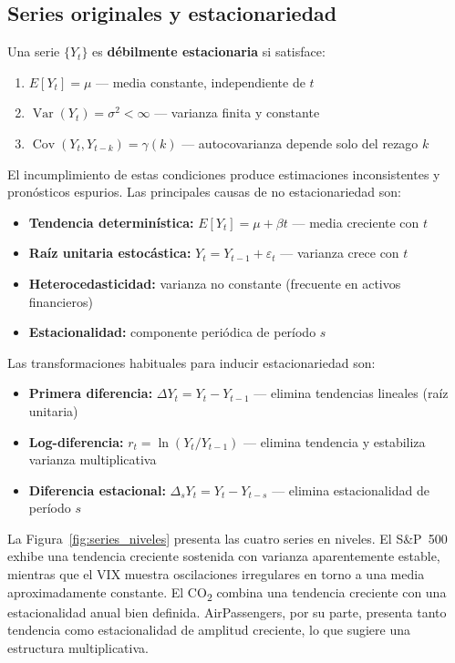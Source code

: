\documentclass[12pt, a4paper]{article}
\begin{document}
\subsection{Series originales y estacionariedad}

Una serie $\{Y_t\}$ es \textbf{débilmente estacionaria} si satisface:

\begin{enumerate}
    \item $E[Y_t] = \mu$ — media constante, independiente de $t$
    \item $\operatorname{Var}(Y_t) = \sigma^2 < \infty$ — varianza finita y constante
    \item $\operatorname{Cov}(Y_t, Y_{t-k}) = \gamma(k)$ — autocovarianza depende solo del rezago $k$
\end{enumerate}

El incumplimiento de estas condiciones produce estimaciones inconsistentes y pronósticos espurios. Las principales causas de no estacionariedad son:

\begin{itemize}
    \item \textbf{Tendencia determinística:} $E[Y_t] = \mu + \beta t$ — media creciente con $t$
    \item \textbf{Raíz unitaria estocástica:} $Y_t = Y_{t-1} + \varepsilon_t$ — varianza crece con $t$
    \item \textbf{Heterocedasticidad:} varianza no constante (frecuente en activos financieros)
    \item \textbf{Estacionalidad:} componente periódica de período $s$
\end{itemize}

Las transformaciones habituales para inducir estacionariedad son:

\begin{itemize}
    \item \textbf{Primera diferencia:} $\Delta Y_t = Y_t - Y_{t-1}$ — elimina tendencias lineales (raíz unitaria)
    \item \textbf{Log-diferencia:} $r_t = \ln(Y_t/Y_{t-1})$ — elimina tendencia y estabiliza varianza multiplicativa
    \item \textbf{Diferencia estacional:} $\Delta_s Y_t = Y_t - Y_{t-s}$ — elimina estacionalidad de período $s$
\end{itemize}

La Figura~\ref{fig:series_niveles} presenta las cuatro series en niveles. El S\&P~500 exhibe una tendencia creciente sostenida con varianza aparentemente estable, mientras que el VIX muestra oscilaciones irregulares en torno a una media aproximadamente constante. El CO\textsubscript{2} combina una tendencia creciente con una estacionalidad anual bien definida. AirPassengers, por su parte, presenta tanto tendencia como estacionalidad de amplitud creciente, lo que sugiere una estructura multiplicativa.
\end{document}
